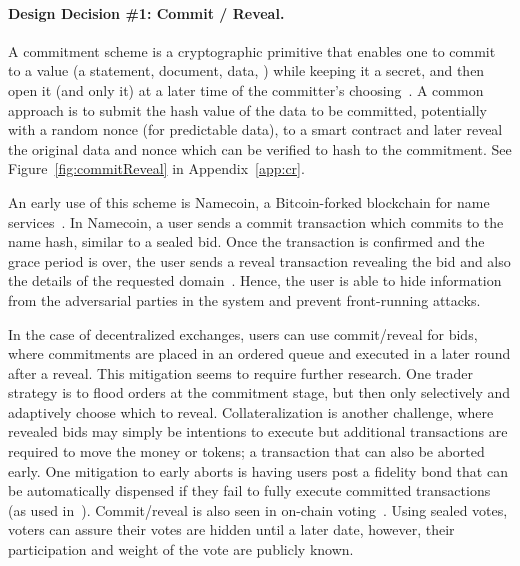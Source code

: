 \paragraph{Design Decision \#1: Commit / Reveal.} \label{CommitmentScheme}
A commitment scheme is a cryptographic primitive that enables one to commit to a value (\eg a statement, document, data, \etc) while keeping it a secret, and then open it (and only it) at a later time of the committer's choosing~\cite{brassard1988minimum}. A common approach is to submit the hash value of the data to be committed, potentially with a random nonce (for predictable data), to a smart contract and later reveal the original data and nonce which can be verified to hash to the commitment. See Figure~\ref{fig:commitReveal} in Appendix~\ref{app:cr}. 

An early use of this scheme is Namecoin, a Bitcoin-forked blockchain for name services~\cite{kalodner2015empirical}. In Namecoin, a user sends a commit transaction which commits to the name hash, similar to a sealed bid. Once the transaction is confirmed and the grace period is over, the user sends a reveal transaction revealing the bid and also the details of the requested domain~\cite{kalodner2015empirical}. Hence, the user is able to hide information from the adversarial parties in the system and prevent front-running attacks. 

In the case of decentralized exchanges, users can use commit/reveal for bids, where commitments are placed in an ordered queue and executed in a later round after a reveal. This mitigation seems to require further research. One trader strategy is to flood orders at the commitment stage, but then only selectively and adaptively choose which to reveal. Collateralization is another challenge, where revealed bids may simply be intentions to execute but additional transactions are required to move the money or tokens; a transaction that can also be aborted early. One mitigation to early aborts is having users post a fidelity bond that can be automatically dispensed if they fail to fully execute committed transactions (as used in~\cite{mccorry2017smart}). Commit/reveal is also seen in on-chain voting~\cite{adChainPLCRVoting}. Using sealed votes, voters can assure their votes are hidden until a later date, however, their participation and weight of the vote are publicly known. 

